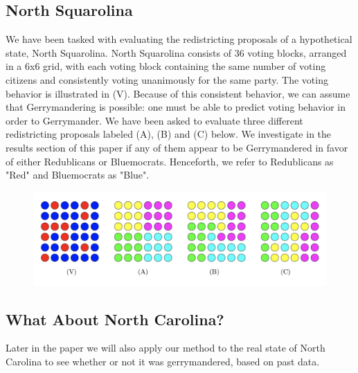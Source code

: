 \documentclass[12pt]{article}
\begin{document}
  
  
\subsection{North Squarolina}
    We have been tasked with evaluating the redistricting proposals of a hypothetical state, North Squarolina. North Squarolina consists of 36 voting blocks, arranged in a $6$x$6$ grid, with each voting block containing the same number of voting citizens and consistently voting unanimously for the same party. The voting behavior is illustrated in (V). Because of this consistent behavior, we can assume that Gerrymandering is possible: one must be able to predict voting behavior in order to Gerrymander. We have been asked to evaluate three different redistricting proposals labeled (A), (B) and (C) below. We investigate in the results section of this paper if any of them appear to be Gerrymandered in favor of either Redublicans or Bluemocrats. Henceforth, we refer to Redublicans as "Red" and Bluemocrats as "Blue".
    
    \begin{figure}[h!]
    \centering
    \includegraphics[scale=0.8]{squarolina}
    \label{fig:squarolina}
    \end{figure}
\subsection{What About North Carolina?}
Later in the paper we will also apply our method to the real state of North Carolina to see whether or not it was gerrymandered, based on past data.
\end{document}
